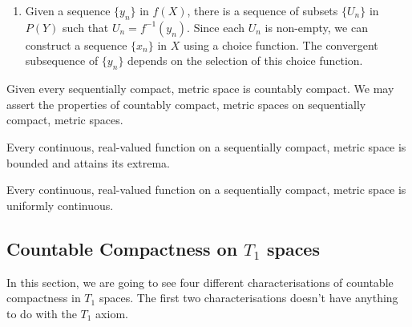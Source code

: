 \begin{remark}
	\begin{enumerate}
		\item Given a sequence $\{y_n\}$ in $f(X)$, there is a sequence of subsets $\{U_n\}$ in $P(Y)$ such that $U_n = f^{-1}(y_n)$. Since each $U_n$ is non-empty, we can construct a sequence $\{x_n\}$ in $X$ using a choice function. The convergent subsequence of $\{y_n\}$ depends on the selection of this choice function.
	\end{enumerate}
\end{remark}

Given every sequentially compact, metric space is countably compact. We may assert the properties of countably compact, metric spaces on sequentially compact, metric spaces.

\begin{theorem}
	Every continuous, real-valued function on a sequentially compact, metric space is bounded and attains its extrema.
\end{theorem}

\begin{theorem}
	Every continuous, real-valued function on a sequentially compact, metric space is uniformly continuous.\cite[Exercises 11.1.6]{joshi}
\end{theorem}

\subsection{Countable Compactness on $T_1$ spaces}
	In this section, we are going to see four different characterisations of countable compactness in $T_1$ spaces.	The first two characterisations doesn't have anything to do with the $T_1$ axiom.

